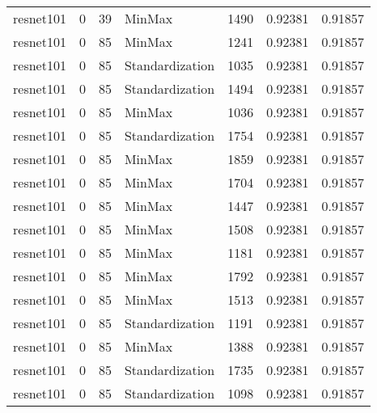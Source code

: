 \begin{tabular}{lrrlrrr}
 resnet101          &             0 &            39 & MinMax          &       1490 &          0.92381 &    0.91857 \\
 resnet101          &             0 &            85 & MinMax          &       1241 &          0.92381 &    0.91857 \\
 resnet101          &             0 &            85 & Standardization &       1035 &          0.92381 &    0.91857 \\
 resnet101          &             0 &            85 & Standardization &       1494 &          0.92381 &    0.91857 \\
 resnet101          &             0 &            85 & MinMax          &       1036 &          0.92381 &    0.91857 \\
 resnet101          &             0 &            85 & Standardization &       1754 &          0.92381 &    0.91857 \\
 resnet101          &             0 &            85 & MinMax          &       1859 &          0.92381 &    0.91857 \\
 resnet101          &             0 &            85 & MinMax          &       1704 &          0.92381 &    0.91857 \\
 resnet101          &             0 &            85 & MinMax          &       1447 &          0.92381 &    0.91857 \\
 resnet101          &             0 &            85 & MinMax          &       1508 &          0.92381 &    0.91857 \\
 resnet101          &             0 &            85 & MinMax          &       1181 &          0.92381 &    0.91857 \\
 resnet101          &             0 &            85 & MinMax          &       1792 &          0.92381 &    0.91857 \\
 resnet101          &             0 &            85 & MinMax          &       1513 &          0.92381 &    0.91857 \\
 resnet101          &             0 &            85 & Standardization &       1191 &          0.92381 &    0.91857 \\
 resnet101          &             0 &            85 & MinMax          &       1388 &          0.92381 &    0.91857 \\
 resnet101          &             0 &            85 & Standardization &       1735 &          0.92381 &    0.91857 \\
 resnet101          &             0 &            85 & Standardization &       1098 &          0.92381 &    0.91857 \\

\end{tabular}

